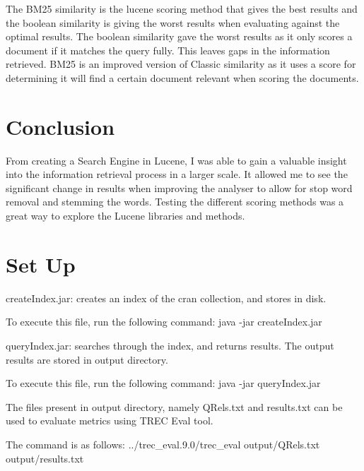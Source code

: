 \newpage	
The BM25 similarity is the lucene scoring method that gives the best results and the boolean similarity is giving the worst results when evaluating against the optimal results. The boolean similarity gave the worst results as it only scores a document if it matches the query fully. This leaves gaps in the information retrieved. BM25 is an improved version of Classic similarity as it uses a score for determining it will find a certain document relevant when scoring the documents. \par 

\section{Conclusion}
From creating a Search Engine in Lucene, I was able to gain a valuable insight into the information retrieval process in a larger scale. It allowed me to see the significant change in results when improving the analyser to allow for stop word removal and stemming  the words. Testing the different scoring methods was a great way to explore the Lucene libraries and methods.\par 

\section{Set Up}
createIndex.jar: creates an index of the cran collection, and stores in disk.

To execute this file, run the following command:
java -jar createIndex.jar

queryIndex.jar: searches through the index, and returns results. The output results are stored in output directory.

To execute this file, run the following command:
java -jar queryIndex.jar

The files present in output directory, namely QRels.txt and results.txt can be used to evaluate metrics using TREC Eval tool.

The command is as follows:
../trec\_eval.9.0/trec\_eval output/QRels.txt output/results.txt
